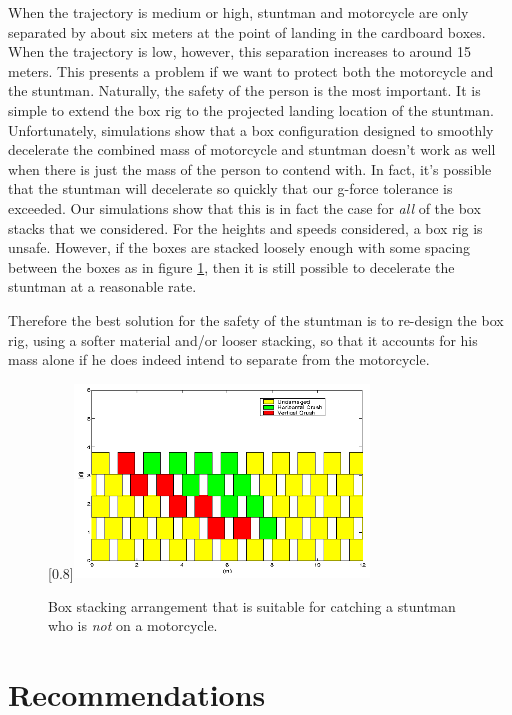 \documentclass[12pt,a4paper,titlepage]{article}
\begin{document}
When the trajectory is medium or high, stuntman and motorcycle are only separated by about six meters at the point of landing in the cardboard boxes.
When the trajectory is low, however, this separation increases to around 15 meters.  This presents a problem if we want to protect both the
motorcycle and the stuntman.  Naturally, the safety of the person is the most important.  It is simple to extend the box rig to the projected
landing location of the stuntman.  Unfortunately, simulations show that a box configuration designed to smoothly decelerate the combined mass
of motorcycle and stuntman doesn't work as well when there is just the mass of the person to contend with.  In fact, it's possible
that the stuntman will decelerate so quickly that our g-force tolerance is exceeded.  Our simulations show that this is in fact the case for {\it all} of the box stacks that we considered.  For the heights and speeds considered, a box rig is unsafe.  %
However, if the boxes are stacked loosely enough with some spacing between the boxes as in figure \ref{personcrash}, then it is still possible to
decelerate the stuntman at a reasonable rate.

Therefore the best solution for the safety of the stuntman is to re-design the box rig, using a softer material and/or looser stacking, so that it
accounts for his mass alone if he does indeed intend to separate from the motorcycle.

\begin{figure}
\caption{\label{personcrash} Box stacking arrangement that is suitable for catching a stuntman who is {\it not} on a motorcycle.}
\begin{center}
\scalebox{1.0}[0.8]{\includegraphics[width=0.7\textwidth]{person_crash.eps}}
\end{center}

\end{figure}


\section{Recommendations}
\end{document}
